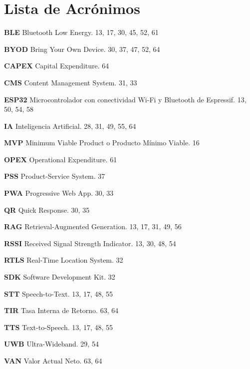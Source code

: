 \chapter*{Lista de Acrónimos}

\noindent \textbf{BLE} \quad Bluetooth Low Energy. 13, 17, 30, 45, 52, 61

\vspace{0.3cm}
\noindent \textbf{BYOD} \quad Bring Your Own Device. 30, 37, 47, 52, 64

\vspace{0.3cm}
\noindent \textbf{CAPEX} \quad Capital Expenditure. 64

\vspace{0.3cm}
\noindent \textbf{CMS} \quad Content Management System. 31, 33

\vspace{0.3cm}
\noindent \textbf{ESP32} \quad Microcontrolador con conectividad Wi-Fi y Bluetooth de Espressif. 13, 50, 54, 58

\vspace{0.3cm}
\noindent \textbf{IA} \quad Inteligencia Artificial. 28, 31, 49, 55, 64

\vspace{0.3cm}
\noindent \textbf{MVP} \quad Minimum Viable Product o Producto Mínimo Viable. 16

\vspace{0.3cm}
\noindent \textbf{OPEX} \quad Operational Expenditure. 61

\vspace{0.3cm}
\noindent \textbf{PSS} \quad Product-Service System. 37

\vspace{0.3cm}
\noindent \textbf{PWA} \quad Progressive Web App. 30, 33

\vspace{0.3cm}
\noindent \textbf{QR} \quad Quick Response. 30, 35

\vspace{0.3cm}
\noindent \textbf{RAG} \quad Retrieval-Augmented Generation. 13, 17, 31, 49, 56

\vspace{0.3cm}
\noindent \textbf{RSSI} \quad Received Signal Strength Indicator. 13, 30, 48, 54

\vspace{0.3cm}
\noindent \textbf{RTLS} \quad Real-Time Location System. 32

\vspace{0.3cm}
\noindent \textbf{SDK} \quad Software Development Kit. 32

\vspace{0.3cm}
\noindent \textbf{STT} \quad Speech-to-Text. 13, 17, 48, 55

\vspace{0.3cm}
\noindent \textbf{TIR} \quad Tasa Interna de Retorno. 63, 64

\vspace{0.3cm}
\noindent \textbf{TTS} \quad Text-to-Speech. 13, 17, 48, 55

\vspace{0.3cm}
\noindent \textbf{UWB} \quad Ultra-Wideband. 29, 54

\vspace{0.3cm}
\noindent \textbf{VAN} \quad Valor Actual Neto. 63, 64
\cleardoublepage
